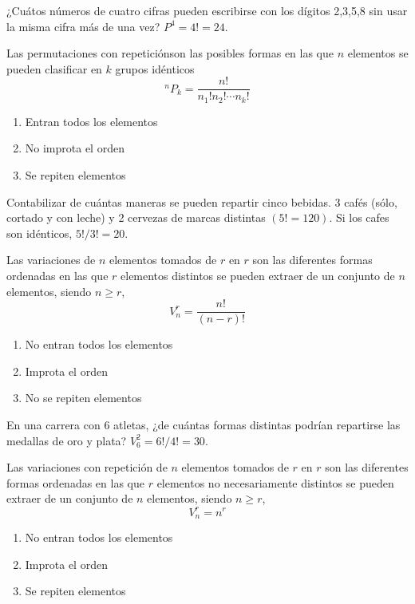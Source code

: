 \begin{ejm}
¿Cuátos números de cuatro cifras pueden escribirse con los dígitos 2,3,5,8 sin usar la misma cifra más de una vez? $P^{4} = 4! = 24$.
\end{ejm}

\begin{defn}
Las permutaciones con repeticiónson las posibles formas en las que $n$ elementos se pueden clasificar en $k$ grupos idénticos \[ {}^nP_k = \frac{n!}{n_1!n_2!\cdots n_k!} \]
\begin{enumerate}[label=(\roman*)]
    \item Entran todos los elementos
    \item No improta el orden
    \item Se repiten elementos
\end{enumerate}
\end{defn}

\begin{ejm}
Contabilizar de cuántas maneras se pueden repartir cinco bebidas. 3 cafés (sólo, cortado y con leche) y 2 cervezas de marcas distintas $(5! = 120)$. Si los cafes son idénticos, $5!/3! = 20$.
\end{ejm}

\begin{defn}[Variaciones]
Las variaciones de $n$ elementos tomados de $r$ en $r$ son las diferentes formas ordenadas en las que $r$ elementos distintos se pueden extraer de un conjunto de $n$ elementos, siendo $n\geq r$, \[ V^r_n = \frac{n!}{(n-r)!} \]
\begin{enumerate}[label=(\roman*)]
    \item No entran todos los elementos
    \item Improta el orden
    \item No se repiten elementos
\end{enumerate}
\end{defn}

\begin{ejm}
En una carrera con 6 atletas, ¿de cuántas formas distintas podrían repartirse las medallas de oro y plata? $V^{2}_6 = 6!/4! = 30$.
\end{ejm}

\begin{defn}
Las variaciones con repetición de $n$ elementos tomados de $r$ en $r$ son las diferentes formas ordenadas en las que $r$ elementos no necesariamente distintos se pueden extraer de un conjunto de $n$ elementos, siendo $n\geq r$, \[ V^r_n = n^r \]
\begin{enumerate}[label=(\roman*)]
    \item No entran todos los elementos
    \item Improta el orden
    \item Se repiten elementos
\end{enumerate}
\end{defn}

